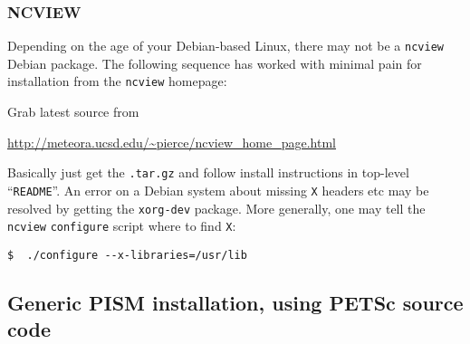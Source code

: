\documentclass[11pt,final]{amsart}
\begin{document}
\subsubsection*{NCVIEW}  Depending on the age of your Debian-based Linux, there may not be a \texttt{ncview} Debian package.  The following sequence has worked with minimal pain for installation from the \texttt{ncview} homepage:

Grab latest source from
\begin{center}
  \url{http://meteora.ucsd.edu/~pierce/ncview_home_page.html}
\end{center}
Basically just get the \texttt{.tar.gz} and follow install instructions in top-level ``\texttt{README}''.  An error on a Debian system about missing \texttt{X} headers etc may be resolved by getting the \texttt{xorg-dev} package.  More generally, one may tell the \texttt{ncview} \texttt{configure} script where to find \texttt{X}:
\begin{verbatim}
$  ./configure --x-libraries=/usr/lib
\end{verbatim}

\vspace{0.3in}

\newpage
\subsection{Generic PISM installation, using PETSc source code}\label{subsec:generic}
\end{document}
